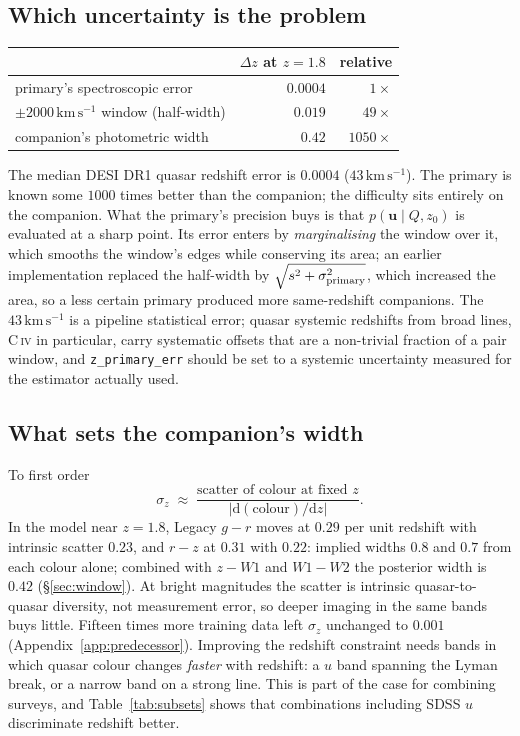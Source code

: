 \documentclass[11pt,a4paper]{article}
\newcommand{\uvec}{\mathbf{u}}
\newcommand{\kms}{\,\mathrm{km\,s^{-1}}}
\begin{document}
\subsection{Which uncertainty is the problem}
\label{sec:whichsigma}

\begin{center}
\begin{tabular}{lrr}
\toprule
 & $\Delta z$ at $z=1.8$ & relative \\
\midrule
primary's spectroscopic error        & $0.0004$ & $1\times$ \\
$\pm2000\kms$ window (half-width)    & $0.019$  & $49\times$ \\
companion's photometric width        & $0.42$   & $1050\times$ \\
\bottomrule
\end{tabular}
\end{center}

The median DESI DR1 quasar redshift error is $0.0004$ ($43\kms$). The primary is
known some $1000$ times better than the companion; the difficulty sits entirely
on the companion. What the primary's precision buys is that
$p(\uvec\mid Q,z_0)$ is evaluated at a sharp point. Its error enters by
\emph{marginalising} the window over it, which smooths the window's edges while
conserving its area; an earlier implementation replaced the half-width by
$\sqrt{s^2+\sigma_{\rm primary}^2}$, which increased the area, so a less certain
primary produced more same-redshift companions. The $43\kms$ is a pipeline
statistical error; quasar systemic redshifts from broad lines, C\,\textsc{iv} in
particular, carry systematic offsets that are a non-trivial fraction of a pair
window, and \texttt{z\_primary\_err} should be set to a systemic uncertainty
measured for the estimator actually used.

\subsection{What sets the companion's width}
\label{sec:whatsets}

To first order
%
\begin{equation}
\sigma_z \;\approx\;
\frac{\text{scatter of colour at fixed } z}
     {\left|\mathrm{d}(\text{colour})/\mathrm{d}z\right|} .
\label{eq:sigmaz}
\end{equation}
%
In the model near $z=1.8$, Legacy $g-r$ moves at $0.29$ per unit redshift with
intrinsic scatter $0.23$, and $r-z$ at $0.31$ with $0.22$: implied widths $0.8$
and $0.7$ from each colour alone; combined with $z-W1$ and $W1-W2$ the posterior
width is $0.42$ (\S\ref{sec:window}).
At bright magnitudes the scatter is intrinsic quasar-to-quasar diversity, not
measurement error, so deeper imaging in the same bands buys little. Fifteen
times more training data left $\sigma_z$ unchanged to $0.001$
(Appendix~\ref{app:predecessor}). Improving the redshift constraint needs bands
in which quasar colour changes \emph{faster} with redshift: a $u$ band spanning
the Lyman break, or a narrow band on a strong line. This is part of the case for
combining surveys, and Table~\ref{tab:subsets} shows that combinations
including SDSS $u$ discriminate redshift better.
\end{document}
